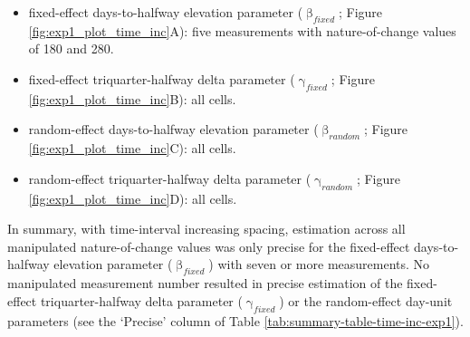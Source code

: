 \documentclass[
12pt, %
twoside,
english]{guelphthesis}
\begin{document}
\begin{itemize}
\tightlist
\item
  fixed-effect days-to-halfway elevation parameter (\(\upbeta_{fixed}\); Figure \ref{fig:exp1_plot_time_inc}A): five measurements with nature-of-change values of 180 and 280.
\item
  fixed-effect triquarter-halfway delta parameter (\(\upgamma_{fixed}\); Figure \ref{fig:exp1_plot_time_inc}B): all cells.
\item
  random-effect days-to-halfway elevation parameter (\(\upbeta_{random}\); Figure \ref{fig:exp1_plot_time_inc}C): all cells.
\item
  random-effect triquarter-halfway delta parameter (\(\upgamma_{random}\); Figure \ref{fig:exp1_plot_time_inc}D): all cells.
\end{itemize}
In summary, with time-interval increasing spacing, estimation across all manipulated nature-of-change values was only precise for the fixed-effect days-to-halfway elevation parameter (\(\upbeta_{fixed}\)) with seven or more measurements. No manipulated measurement number resulted in precise estimation of the fixed-effect triquarter-halfway delta parameter (\(\upgamma_{fixed}\)) or the random-effect day-unit parameters (see the `Precise' column of Table \ref{tab:summary-table-time-inc-exp1}).
\end{document}
